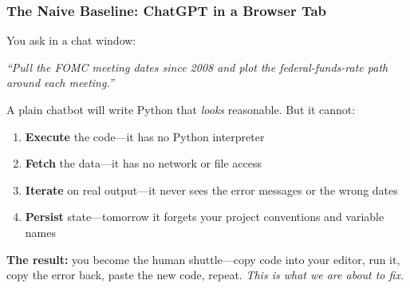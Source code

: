 \documentclass[10pt,english,aspectratio=169]{beamer}
\begin{document}
\begin{frame}
\frametitle{The Naive Baseline: ChatGPT in a Browser Tab}

You ask in a chat window:

\vspace{0.2cm}
\begin{center}
\textit{``Pull the FOMC meeting dates since 2008 and plot the federal-funds-rate path around each meeting.''}
\end{center}
\vspace{0.2cm}

A plain chatbot will write Python that \textit{looks} reasonable. But it cannot:

\begin{enumerate}
    \item \textbf{Execute} the code---it has no Python interpreter
    \item \textbf{Fetch} the data---it has no network or file access
    \item \textbf{Iterate} on real output---it never sees the error messages or the wrong dates
    \item \textbf{Persist} state---tomorrow it forgets your project conventions and variable names
\end{enumerate}

\vspace{0.3cm}

\textbf{The result:} you become the human shuttle---copy code into your editor, run it, copy the error back, paste the new code, repeat. \textit{This is what we are about to fix.}
\end{frame}
\end{document}
